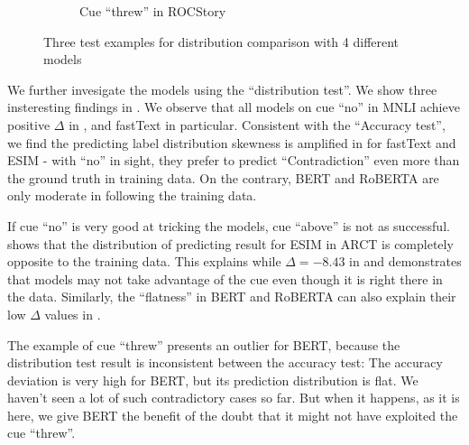 {\begin{figure}[th]
\begin{subfigure}[b]{0.3\textwidth}
\caption{Cue ``threw'' in ROCStory}
\label{fig:cue_threw}
\end{subfigure}
\caption{Three test examples for distribution comparison with 4 different models}
\label{fig:cue_result}
\end{figure}


We further invesigate the models using the
``distribution test''. 
We show three insteresting findings in . 
We observe that all models on cue ``no'' in MNLI 
achieve positive $\Delta$ in , and fastText in particular. 
Consistent with the ``Accuracy test'', we find the predicting label distribution 
skewness is amplified in  for fastText and ESIM -  
with ``no'' in sight, they prefer to predict ``Contradiction'' even more
than the ground truth in training data.
On the contrary, BERT and RoBERTA are only moderate in following
the training data. 

If cue ``no'' is very good at tricking the models,
cue ``above'' is not as successful. 
 shows that 
the distribution of predicting result for ESIM in ARCT 
is completely opposite to the training data. 
This explains while $\Delta=-8.43$ in  and
demonstrates that models may not take advantage of the cue even though it is
right there in the data.
Similarly, the ``flatness'' in BERT and RoBERTA 
can also explain their low $\Delta$ values in . 

The example of cue ``threw'' presents an outlier for BERT,
because the distribution test result is inconsistent between the accuracy test: 
The accuracy deviation is very high for BERT, but its prediction distribution is
flat. We haven't seen a lot of such contradictory cases so far. 
But when it happens, as it is here, we give BERT the benefit of the doubt 
that it might not have exploited the cue ``threw''. 

}%
